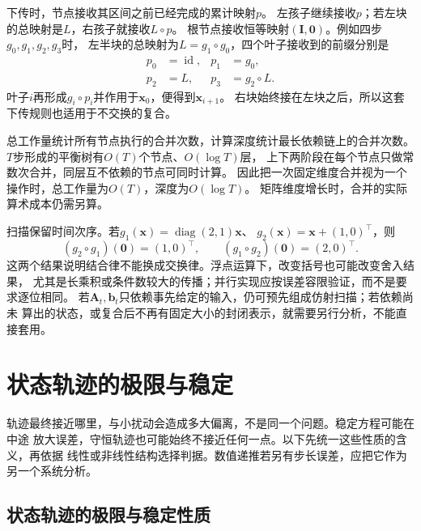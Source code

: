 下传时，节点接收其区间之前已经完成的累计映射$p$。
左孩子继续接收$p$；若左块的总映射是$L$，右孩子就接收$L\circ p$。
根节点接收恒等映射$(\bm I,\bm0)$。例如四步$g_0,g_1,g_2,g_3$时，
左半块的总映射为$L=g_1\circ g_0$，四个叶子接收到的前缀分别是
\[
 \begin{aligned}
 p_0&=\operatorname{id},&p_1&=g_0,\\
 p_2&=L,&p_3&=g_2\circ L.
 \end{aligned}
\]
叶子$i$再形成$g_i\circ p_i$并作用于$\bm x_0$，便得到$\bm x_{i+1}$。
右块始终接在左块之后，所以这套下传规则也适用于不交换的复合。

总工作量统计所有节点执行的合并次数，计算深度统计最长依赖链上的合并次数。
$T$步形成的平衡树有$O(T)$个节点、$O(\log T)$层，
上下两阶段在每个节点只做常数次合并，同层互不依赖的节点可同时计算。
因此把一次固定维度合并视为一个操作时，总工作量为$O(T)$，深度为$O(\log T)$。
矩阵维度增长时，合并的实际算术成本仍需另算。

扫描保留时间次序。若$g_1(\bm x)=\operatorname{diag}(2,1)\bm x$、
$g_2(\bm x)=\bm x+(1,0)^\top$，则
\[
  (g_2\circ g_1)(\bm0)=(1,0)^\top,\qquad
  (g_1\circ g_2)(\bm0)=(2,0)^\top.
\]
这两个结果说明结合律不能换成交换律。浮点运算下，改变括号也可能改变舍入结果，
尤其是长乘积或条件数较大的传播；并行实现应按误差容限验证，而不是要求逐位相同。
若$\bm A_t,\bm b_t$只依赖事先给定的输入，仍可预先组成仿射扫描；若依赖尚未
算出的状态，或复合后不再有固定大小的封闭表示，就需要另行分析，不能直接套用。

\section{状态轨迹的极限与稳定}
\label{sec:dynamical-stability-sensitivity}

轨迹最终接近哪里，与小扰动会造成多大偏离，不是同一个问题。稳定方程可能在中途
放大误差，守恒轨迹也可能始终不接近任何一点。以下先统一这些性质的含义，再依据
线性或非线性结构选择判据。数值递推若另有步长误差，应把它作为另一个系统分析。

\subsection{状态轨迹的极限与稳定性质}

